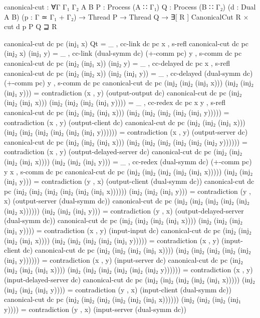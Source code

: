 \begin{code}
canonical-cut :
  ∀{Γ Γ₁ Γ₂ A B} {P : Process (A ∷ Γ₁)} {Q : Process (B ∷ Γ₂)}
  (d : Dual A B) (p : Γ ≃ Γ₁ + Γ₂) →
  Thread P → Thread Q → ∃[ R ] CanonicalCut R × cut d p P Q ⊒ R
\end{code}

\begin{code}[hide]
canonical-cut dc pc (inj₁ x) Qt = _ , cc-link dc pc x , s-refl
canonical-cut dc pc (inj₂ x) (inj₁ y) = _ , cc-link (dual-symm dc) (+-comm pc) y , s-comm dc pc
canonical-cut dc pc (inj₂ (inj₁ x)) (inj₂ y) = _ , cc-delayed dc pc x , s-refl
canonical-cut dc pc (inj₂ (inj₂ x)) (inj₂ (inj₁ y)) = _ , cc-delayed (dual-symm dc) (+-comm pc) y , s-comm dc pc
canonical-cut dc pc (inj₂ (inj₂ (inj₁ x))) (inj₂ (inj₂ (inj₁ y))) = contradiction (x , y) (output-output dc)
canonical-cut dc pc (inj₂ (inj₂ (inj₁ x))) (inj₂ (inj₂ (inj₂ (inj₁ y)))) = _ , cc-redex dc pc x y , s-refl
canonical-cut dc pc (inj₂ (inj₂ (inj₁ x))) (inj₂ (inj₂ (inj₂ (inj₂ (inj₁ y))))) = contradiction (x , y) (output-client dc)
canonical-cut dc pc (inj₂ (inj₂ (inj₁ x))) (inj₂ (inj₂ (inj₂ (inj₂ (inj₂ (inj₁ y)))))) = contradiction (x , y) (output-server dc)
canonical-cut dc pc (inj₂ (inj₂ (inj₁ x))) (inj₂ (inj₂ (inj₂ (inj₂ (inj₂ (inj₂ y)))))) = contradiction (x , y) (output-delayed-server dc)
canonical-cut dc pc (inj₂ (inj₂ (inj₂ (inj₁ x)))) (inj₂ (inj₂ (inj₁ y))) = _ , cc-redex (dual-symm dc) (+-comm pc) y x , s-comm dc pc
canonical-cut dc pc (inj₂ (inj₂ (inj₂ (inj₂ (inj₁ x))))) (inj₂ (inj₂ (inj₁ y))) = contradiction (y , x) (output-client (dual-symm dc))
canonical-cut dc pc (inj₂ (inj₂ (inj₂ (inj₂ (inj₂ (inj₁ x)))))) (inj₂ (inj₂ (inj₁ y))) = contradiction (y , x) (output-server (dual-symm dc))
canonical-cut dc pc (inj₂ (inj₂ (inj₂ (inj₂ (inj₂ (inj₂ x)))))) (inj₂ (inj₂ (inj₁ y))) = contradiction (y , x) (output-delayed-server (dual-symm dc))
canonical-cut dc pc (inj₂ (inj₂ (inj₂ (inj₁ x)))) (inj₂ (inj₂ (inj₂ (inj₁ y)))) = contradiction (x , y) (input-input dc)
canonical-cut dc pc (inj₂ (inj₂ (inj₂ (inj₁ x)))) (inj₂ (inj₂ (inj₂ (inj₂ (inj₁ y))))) = contradiction (x , y) (input-client dc)
canonical-cut dc pc (inj₂ (inj₂ (inj₂ (inj₁ x)))) (inj₂ (inj₂ (inj₂ (inj₂ (inj₂ (inj₁ y)))))) = contradiction (x , y) (input-server dc)
canonical-cut dc pc (inj₂ (inj₂ (inj₂ (inj₁ x)))) (inj₂ (inj₂ (inj₂ (inj₂ (inj₂ (inj₂ y)))))) = contradiction (x , y) (input-delayed-server dc)
canonical-cut dc pc (inj₂ (inj₂ (inj₂ (inj₂ (inj₁ x))))) (inj₂ (inj₂ (inj₂ (inj₁ y)))) = contradiction (y , x) (input-client (dual-symm dc))
canonical-cut dc pc (inj₂ (inj₂ (inj₂ (inj₂ (inj₂ (inj₁ x)))))) (inj₂ (inj₂ (inj₂ (inj₁ y)))) = contradiction (y , x) (input-server (dual-symm dc))

\end{code}
